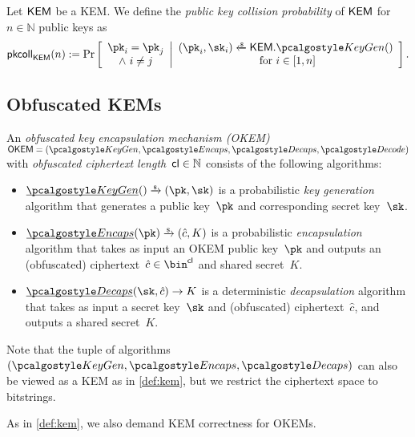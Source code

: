 \begin{definition}
    \label{def:pk-collisions}
    Let $\mathsf{KEM}$ be a KEM.
    We define the \emph{public key collision probability} of $\mathsf{KEM}$ for $n \in \mathbb{N}$ public keys as
    \[
        \pkcoll{\KEM}(n) := \Pr\left[
            \begin{array}{c}
                \pk_i = \pk_j \\
                \land~ i \neq j
            \end{array}
            \middle|
            \begin{array}{c}
                (\pk_i,\sk_i) \getsr \KEM.\kgen() \\
                \text{ for } i \in [1,n]
            \end{array}
            \right].
    \]
\end{definition}

\subsection{Obfuscated KEMs}

\begin{definition}
    \label{def:okem}
    An \emph{obfuscated key encapsulation mechanism (OKEM)} $\OKEM = (\kgen, \encaps, \decaps, \decode)$ with \emph{obfuscated ciphertext length}~$\mathsf{cl} \in \mathbb{N}$ consists of the following algorithms:
    \begin{itemize}
        \item $\ul{\kgen}() \tor (\pk,\sk)$ is a probabilistic \emph{key generation} algorithm that generates a public key~$\pk$ and corresponding secret key~$\sk$.

        \item $\ul{\encaps}(\pk) \tor (\hat c, K)$ is a probabilistic \emph{encapsulation} algorithm that takes as input an OKEM public key~$\pk$ and outputs an (obfuscated) ciphertext~$\hat c \in \bin^\obfctxtlen$ and shared secret~$K$.

        \item $\ul{\decaps}(\sk,\hat c) \to K$ is a deterministic \emph{decapsulation} algorithm that takes as input a secret key~$\sk$ and (obfuscated) ciphertext~$\hat c$, and outputs a shared secret~$K$.
    \end{itemize}
    Note that the tuple of algorithms $(\kgen, \encaps, \decaps)$ can also be viewed as a KEM as in \cref{def:kem}, but we restrict the ciphertext space to bitstrings.

    As in \cref{def:kem}, we also demand KEM correctness for OKEMs.
\end{definition}

